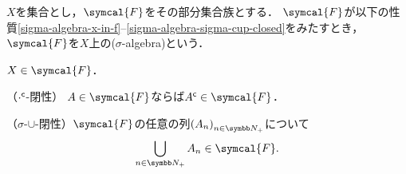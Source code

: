 \documentclass[main.tex]{subfiles}
\begin{document}
\begin{thmbox}
\begin{definition}
\(X\)を集合とし，\(\symcal{F}\)をその部分集合族とする．
\(\symcal{F}\)が以下の性質\ref{sigma-algebra-x-in-f}--\ref{sigma-algebra-sigma-cup-closed}をみたすとき，
\(\symcal{F}\)を\(X\)上の(\(\sigma\)-algebra)という{\footnotemark}．
\begin{conditions}
    \item\label{sigma-algebra-x-in-f}
        \(X \in \symcal{F}\)．
    \item\label{sigma-algebra-comp-closed} （\({\mathord{\cdot}}^{\mathsf{c}}\)-閉性） \(A \in \symcal{F}\)ならば\(\setcomp{A} \in \symcal{F}\)．
    \item\label{sigma-algebra-sigma-cup-closed} （\(\sigma\)-\(\mathord{\cup}\)-閉性）\(\symcal{F}\)の任意の列\(\Sequence{A}\)について
        \begin{align*}
            \bigcup_{n \in \PositiveInteger} A_n \in \symcal{F}.
        \end{align*}
\end{conditions}
\end{definition}
\end{thmbox}

\end{document}
